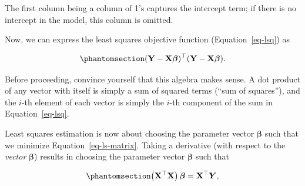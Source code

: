 \documentclass[
  letterpaper,
  DIV=11,
  numbers=noendperiod]{scrreprt}
\theoremstyle{definition}
\theoremstyle{plain}
\theoremstyle{definition}
\theoremstyle{remark}
\begin{document}
\begin{tcolorbox}[enhanced jigsaw, rightrule=.15mm, leftrule=.75mm, opacityback=0, coltitle=black, bottomrule=.15mm, opacitybacktitle=0.6, left=2mm, colframe=quarto-callout-note-color-frame, breakable, colback=white, arc=.35mm, toprule=.15mm, toptitle=1mm, bottomtitle=1mm, title=\textcolor{quarto-callout-note-color}{\faInfo}\hspace{0.5em}{Note}, titlerule=0mm, colbacktitle=quarto-callout-note-color!10!white]

The first column being a column of 1's captures the intercept term; if
there is no intercept in the model, this column is omitted.

\end{tcolorbox}

Now, we can express the least squares objective function
(Equation~\ref{eq-lsq}) as

\begin{equation}\phantomsection\label{eq-ls-matrix}{(\mathbf{Y} - \mathbf{X}\boldsymbol{\beta})^\top (\mathbf{Y} - \mathbf{X} \boldsymbol{\beta}).}\end{equation}

\begin{tcolorbox}[enhanced jigsaw, rightrule=.15mm, leftrule=.75mm, opacityback=0, coltitle=black, bottomrule=.15mm, opacitybacktitle=0.6, left=2mm, colframe=quarto-callout-tip-color-frame, breakable, colback=white, arc=.35mm, toprule=.15mm, toptitle=1mm, bottomtitle=1mm, title=\textcolor{quarto-callout-tip-color}{\faLightbulb}\hspace{0.5em}{Tip}, titlerule=0mm, colbacktitle=quarto-callout-tip-color!10!white]

Before proceeding, convince yourself that this algebra makes sense. A
dot product of any vector with itself is simply a sum of squared terms
(``sum of squares''), and the \(i\)-th element of each vector is simply
the \(i\)-th component of the sum in Equation~\ref{eq-lsq}.

\end{tcolorbox}

Least squares estimation is now about choosing the parameter vector
\(\boldsymbol{\beta}\) such that we minimize
Equation~\ref{eq-ls-matrix}. Taking a derivative (with respect to the
\emph{vector} \(\boldsymbol{\beta}\)) results in choosing the parameter
vector \(\boldsymbol{\beta}\) such that

\begin{equation}\phantomsection\label{eq-norm-eq}{\left(\mathbf{X}^\top \mathbf{X}\right) \boldsymbol{\beta} = \mathbf{X}^\top \boldsymbol{Y},}\end{equation}
\end{document}
